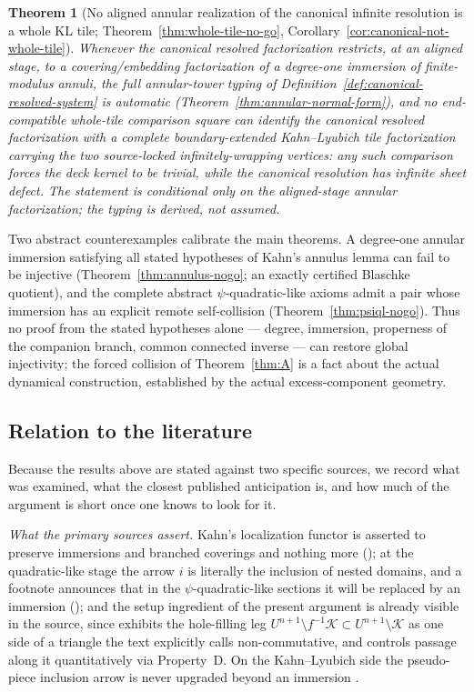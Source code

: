 \documentclass[11pt,reqno]{amsart}
\newtheorem{theorem}{Theorem}[section]
\theoremstyle{definition}
\theoremstyle{remark}
\begin{document}
\begin{theorem}[No aligned annular realization of the canonical
infinite resolution is a whole KL tile;
Theorem~\ref{thm:whole-tile-no-go},
Corollary~\ref{cor:canonical-not-whole-tile}]\label{thm:E}
Whenever the canonical resolved factorization restricts, at an aligned
stage, to a covering/embedding factorization of a degree-one immersion
of finite-modulus annuli, the full annular-tower typing of
Definition~\ref{def:canonical-resolved-system} is automatic
(Theorem~\ref{thm:annular-normal-form}), and no end-compatible
whole-tile comparison square can identify the
canonical resolved factorization with a complete boundary-extended
Kahn--Lyubich tile factorization carrying the two source-locked
infinitely-wrapping vertices: any such comparison forces the deck
kernel to be trivial, while the canonical resolution has infinite
sheet defect.  The statement is conditional only on the aligned-stage
annular factorization; the typing is derived, not assumed.
\end{theorem}

Two abstract counterexamples calibrate the main theorems.  A degree-one
annular immersion satisfying all stated hypotheses of Kahn's annulus
lemma can fail to be injective (Theorem~\ref{thm:annulus-nogo}; an
exactly certified Blaschke quotient), and the complete abstract
$\psi$-quadratic-like axioms admit a pair whose immersion has an
explicit remote self-collision (Theorem~\ref{thm:psiql-nogo}).  Thus no
proof from the stated hypotheses alone --- degree, immersion,
properness of the companion branch, common connected inverse --- can
restore global injectivity; the forced collision of
Theorem~\ref{thm:A} is a fact about the actual dynamical construction,
established by the actual excess-component geometry.

\subsection{Relation to the literature}
\label{subsec:literature}
Because the results above are stated against two specific sources, we
record what was examined, what the closest published anticipation is,
and how much of the argument is short once one knows to look for it.

\emph{What the primary sources assert.}  Kahn's localization functor is
asserted to preserve immersions and branched coverings and nothing more
(\cite[\S\S7.4.1--7.4.2, pp.~43--45]{KahnPrimitive06}); at the
quadratic-like stage the arrow $i$ is literally the inclusion of nested
domains, and a footnote announces that in the $\psi$-quadratic-like
sections it will be replaced by an immersion
(\cite[\S6, p.~31 and footnote 15]{KahnPrimitive06}); and the setup
ingredient of the present argument is already visible in the source, since
\cite[\S6.1, pp.~31--32]{KahnPrimitive06} exhibits the hole-filling leg
$U^{n+1}\setminus f^{-1}\mathcal K\subset U^{n+1}\setminus\mathcal K$ as
one side of a triangle the text explicitly calls non-commutative, and
controls passage along it quantitatively via Property~D.  On the
Kahn--Lyubich side the pseudo-piece inclusion arrow is never upgraded
beyond an immersion \cite[\S3.2.2, Lemma~3.4]{KLDecorations08}.
\end{document}
